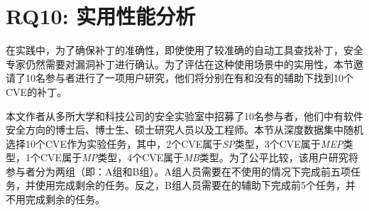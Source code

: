 \section{RQ10: 实用性能分析}\label{sec:usefulness}
在实践中，为了确保补丁的准确性，即使使用了较准确的自动工具查找补丁，安全专家仍然需要对漏洞补丁进行确认。为了评估\tool 在这种使用场景中的实用性，本节邀请了10名参与者进行了一项用户研究，他们将分别在有和没有\tool 的辅助下找到10个CVE的补丁。

本文作者从多所大学和科技公司的安全实验室中招募了10名参与者，他们中有软件安全方向的博士后、博士生、硕士研究人员以及工程师。本节从深度数据集中随机选择10个CVE作为实验任务，其中，2个CVE属于\textit{SP}类型，3个CVE属于\textit{MEP}类型，1个CVE属于\textit{MP}类型，4个CVE属于\textit{MB}类型。为了公平比较，该用户研究将参与者分为两组（即：A组和B组）。A组人员需要在不使用\tool 的情况下完成前五项任务，并使用\tool 完成剩余的任务。反之，B组人员需要在\tool 的辅助下完成前5个任务，并不用\tool 完成剩余的任务。


